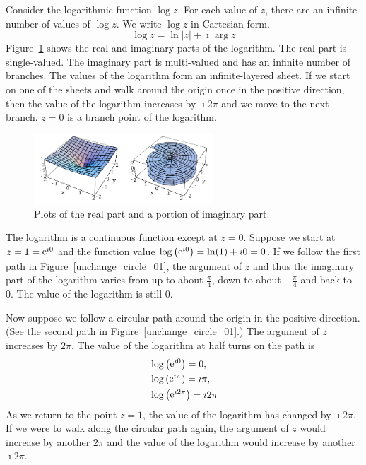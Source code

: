 \begin{Example}
  \label{ex_bp_log}
  Consider the logarithmic function $\log z$.  For each value of $z$, there are
  an infinite number of values of $\log z$.  
  We write $\log z$ in Cartesian form.
  \[
    \log z = \ln |z| + \imath \arg z
  \]
  Figure~\ref{logz_reim} shows the real and imaginary parts of the logarithm.
  The real part is single-valued.  The imaginary part is multi-valued and
  has an infinite number of branches.   The values of the logarithm form
  an infinite-layered sheet.  If we start on one of the sheets and walk
  around the origin once in the positive direction, then the value of the
  logarithm increases by $\imath 2 \pi$ and we move to the next branch.
  $z = 0$ is a branch point of the logarithm.

  \begin{figure}[htbp!]
    \begin{center}
      \includegraphics[width=0.6\textwidth]{fcv/function/logz_reim}
    \end{center}
    \caption{Plots of the real part and a portion of imaginary part.}
    \label{logz_reim}
  \end{figure}


  The logarithm is a continuous function except at $z = 0$.  Suppose
  we start at $z = 1 = \mathop{\mathrm{e}}\nolimits^{\imath 0}$ and the function value $\log\left(
  \mathop{\mathrm{e}}\nolimits^{\imath 0} \right) = \ln(1) + \imath 0 = 0$.  If we follow the first
  path in Figure~\ref{unchange_circle_01}, the argument of $z$ and
  thus the imaginary part of the logarithm varies from up to about
  $\frac{\pi}{4}$, down to about $-\frac{\pi}{4}$ and back to 0.  The
  value of the logarithm is still $0$.

  Now suppose we follow a circular path around the origin in the positive
  direction.  (See the second path in Figure~\ref{unchange_circle_01}.)
  The argument of $z$ increases by $2 \pi$.  The value of the logarithm at
  half turns on the path is
  \begin{align*}
    &\log\left( \mathop{\mathrm{e}}\nolimits^{\imath 0} \right) = 0, 
    \\
    &\log\left( \mathop{\mathrm{e}}\nolimits^{\imath \pi} \right) = \imath \pi, 
    \\
    &\log\left( \mathop{\mathrm{e}}\nolimits^{\imath 2 \pi} \right) = \imath 2 \pi
  \end{align*}
  As we return to the point $z = 1$, the value of the logarithm has changed
  by $\imath 2 \pi$.
  If we were to walk along the circular path again, the argument of $z$
  would increase by another $2 \pi$ and the value of the logarithm would
  increase by another $\imath 2 \pi$.



\end{Example}
